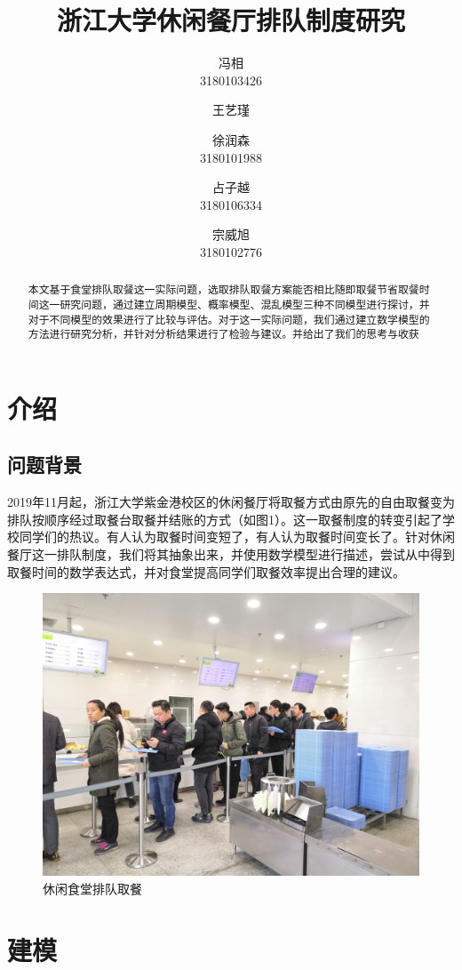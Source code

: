 \documentclass[lang=cn,10pt,a4paper]{elegantpaper}
\title{浙江大学休闲餐厅排队制度研究}
\author{冯相 \\3180103426 \and 王艺瑾 \\ \and 徐润森 \\3180101988 \and 占子越 \\3180106334 \and 宗威旭 \\3180102776}
\institute{浙江大学}
\date{\zhtoday}
\begin{document}
\maketitle

\begin{abstract}
本文基于食堂排队取餐这一实际问题，选取排队取餐方案能否相比随即取餐节省取餐时间这一研究问题，通过建立周期模型、概率模型、混乱模型三种不同模型进行探讨，并对于不同模型的效果进行了比较与评估。对于这一实际问题，我们通过建立数学模型的方法进行研究分析，并针对分析结果进行了检验与建议。并给出了我们的思考与收获
\end{abstract}

\section{介绍}
\subsection{问题背景}
2019年11月起，浙江大学紫金港校区的休闲餐厅将取餐方式由原先的自由取餐变为排队按顺序经过取餐台取餐并结账的方式（如图1）。这一取餐制度的转变引起了学校同学们的热议。有人认为取餐时间变短了，有人认为取餐时间变长了。针对休闲餐厅这一排队制度，我们将其抽象出来，并使用数学模型进行描述，尝试从中得到取餐时间的数学表达式，并对食堂提高同学们取餐效率提出合理的建议。\\
\begin{figure}[htbp]
  \centering
  \includegraphics[scale=0.07]{./image/pic1.jpg}
  \caption{休闲食堂排队取餐}
\end{figure}
\section{建模}
\end{document}
